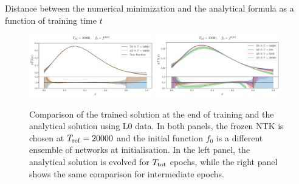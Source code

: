 
Distance between the numerical minimization and the analytical formula as a
function of training time $t$



\newpage


\begin{figure}[ht!]
    \centering
    \includegraphics[width=0.48\textwidth]{plots/analytical_solution/evolution/evolution_epoch_50000_L0.pdf}
    \includegraphics[width=0.48\textwidth]{plots/analytical_solution/evolution/evolution_epochs_700_5000_20000_L0.pdf}
    \caption{Comparison of the trained solution at the end of training and
    the analytical solution using L0 data. In both panels, the
    frozen NTK is chosen at $T_{\rm ref} = 20000$ and the initial function $f_0$
    is a different ensemble of networks at initialisation. In the left panel,
    the analytical solution is evolved for $T_{\rm tot}$ epochs, while the right
    panel shows the same comparison for intermediate epochs.}
    \label{fig:xT3_analytical_init_L0}
  \end{figure}


